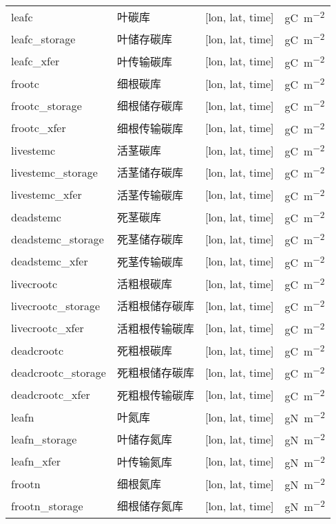 {\begin{longtable}[htbp]{lp{}ll}
\bottomrule
\endfoot
\bottomrule
\endlastfoot
leafc & 叶碳库 & {[}lon, lat, time{]} & \unit{gC.m^{-2}} \\
leafc\_storage & 叶储存碳库 & {[}lon, lat, time{]}  & \unit{gC.m^{-2}} \\
leafc\_xfer & 叶传输碳库 & {[}lon, lat, time{]}  & \unit{gC.m^{-2}} \\
frootc & 细根碳库 & {[}lon, lat, time{]}  & \unit{gC.m^{-2}} \\
frootc\_storage& 细根储存碳库 & {[}lon, lat, time{]} & \unit{gC.m^{-2}} \\
frootc\_xfer & 细根传输碳库 & {[}lon, lat, time{]} & \unit{gC.m^{-2}} \\
livestemc & 活茎碳库 & {[}lon, lat, time{]}  & \unit{gC.m^{-2}} \\
livestemc\_storage & 活茎储存碳库 & {[}lon, lat, time{]} & \unit{gC.m^{-2}} \\
livestemc\_xfer & 活茎传输碳库 & {[}lon, lat, time{]} & \unit{gC.m^{-2}} \\
deadstemc & 死茎碳库 & {[}lon, lat, time{]}  & \unit{gC.m^{-2}} \\
deadstemc\_storage  & 死茎储存碳库 & {[}lon, lat, time{]} & \unit{gC.m^{-2}} \\
deadstemc\_xfer & 死茎传输碳库 & {[}lon, lat, time{]} & \unit{gC.m^{-2}} \\
livecrootc & 活粗根碳库 & {[}lon, lat, time{]}  & \unit{gC.m^{-2}} \\
livecrootc\_storage & 活粗根储存碳库 & {[}lon, lat, time{]} & \unit{gC.m^{-2}} \\
livecrootc\_xfer   & 活粗根传输碳库 & {[}lon, lat, time{]} & \unit{gC.m^{-2}} \\
deadcrootc     & 死粗根碳库 & {[}lon, lat, time{]}  & \unit{gC.m^{-2}} \\
deadcrootc\_storage & 死粗根储存碳库 & {[}lon, lat, time{]}  & \unit{gC.m^{-2}} \\
deadcrootc\_xfer   & 死粗根传输碳库 & {[}lon, lat, time{]} & \unit{gC.m^{-2}} \\
leafn        & 叶氮库 & {[}lon, lat, time{]}  & \unit{gN.m^{-2}} \\
leafn\_storage    & 叶储存氮库 & {[}lon, lat, time{]}  & \unit{gN.m^{-2}} \\
leafn\_xfer     & 叶传输氮库 & {[}lon, lat, time{]}  & \unit{gN.m^{-2}} \\
frootn       & 细根氮库 & {[}lon, lat, time{]}  & \unit{gN.m^{-2}} \\
frootn\_storage   & 细根储存氮库 & {[}lon, lat, time{]} & \unit{gN.m^{-2}} \\

\end{longtable}}
